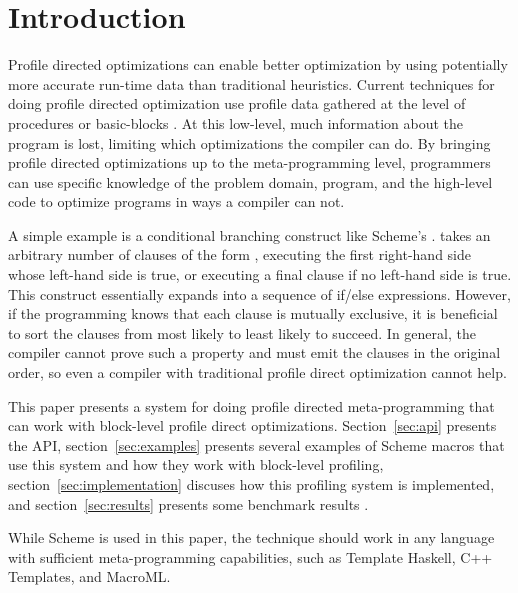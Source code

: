 \section{Introduction}
\label{sec:intro}
Profile directed optimizations can enable better optimization by using
potentially more accurate run-time data than traditional heuristics.
Current techniques for doing profile directed optimization use profile
data gathered at the level of procedures or basic-blocks . At
this low-level, much information about the program is lost, limiting
which optimizations the compiler can do. By bringing profile directed
optimizations up to the meta-programming level, programmers can use
specific knowledge of the problem domain, program, and the high-level
code to optimize programs in ways a compiler can not. 

A simple example is a conditional branching construct like Scheme's
.  takes an arbitrary number of clauses of
the form , executing the first right-hand side whose
left-hand side is true, or executing a final  clause if no
left-hand side is true.  This construct essentially expands into a
sequence of if/else expressions. However, if the programming knows that
each clause is mutually exclusive, it is beneficial to sort the clauses
from most likely to least likely to succeed. In general, the compiler
cannot prove such a property and must emit the clauses in the original
order, so even a compiler with traditional profile direct optimization
cannot help.

This paper presents a system for doing profile directed meta-programming
that can work with block-level profile direct optimizations.
Section~\ref{sec:api} presents the API, section~\ref{sec:examples}
presents several examples of Scheme macros that use this system and how
they work with block-level profiling, section~\ref{sec:implementation}
discuses how this profiling system is implemented, and
section~\ref{sec:results} presents some benchmark results .

While Scheme is used in this paper, the technique should work in any
language with sufficient meta-programming capabilities, such as Template
Haskell, C++ Templates, and MacroML. 
